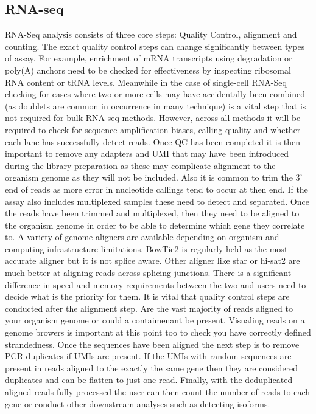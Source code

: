 \documentclass[../main.tex]{subfiles}
\begin{document}
\subsection{RNA-seq}
RNA-Seq analysis consists of three core steps: Quality Control, alignment and counting. The exact quality control steps can change significantly between types of assay. For example, enrichment of mRNA transcripts using degradation or poly(A) anchors need to be checked for effectiveness by inspecting ribosomal RNA content or tRNA levels. Meanwhile in the case of single-cell RNA-Seq checking for cases where two or more cells may have accidentally been combined (as doublets are common in occurrence in many technique) is a vital step that is not required for bulk RNA-seq methods. However, across all methods it will be required to check for sequence amplification biases, calling quality and whether each lane has successfully detect reads. Once QC has been completed it is then important to remove any adapters and UMI that may have been introduced during the library preparation as these may complicate alignment to the organism genome as they will not be included. Also it is common to trim the 3' end of reads as more error in nucleotide callings tend to occur at then end. If the assay also includes multiplexed samples these need to detect and separated. Once the reads have been trimmed and multiplexed, then they need to be aligned to the organism genome in order to be able to determine which gene they correlate to. A variety of genome aligners are available depending on organism and computing infrastructure limitations.  BowTie2 is regularly held as the most accurate aligner but it is not splice aware. Other aligner like star or hi-sat2 are much better at aligning reads across splicing junctions. There is a significant difference in speed and memory requirements between the two and users need to decide what is the priority for them. It is vital that quality control steps are conducted after the alignment step. Are the vast majority of reads aligned to your organism genome or could a contaimenant be present. Visualing reads on a genome browers is important at this point too to check you have correctly defined strandedness. Once the sequences have been aligned the next step is to remove PCR duplicates if UMIs are present. If the UMIs with random sequences are present in reads aligned to the exactly the same gene then they are considered duplicates and can be flatten to just one read. Finally, with the deduplicated aligned reads fully processed the user can then count the number of reads to each gene or conduct other downstream analyses such as detecting isoforms.
\end{document}
